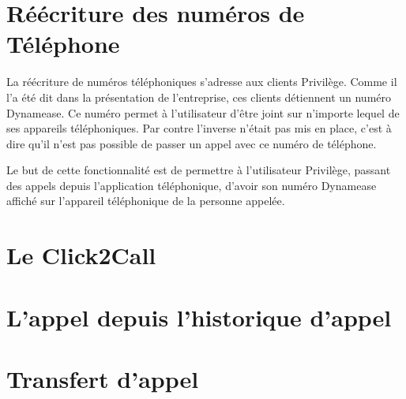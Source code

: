 \section{Réécriture des numéros de Téléphone}

La réécriture de numéros téléphoniques s'adresse aux clients Privilège. Comme il l'a été dit dans la présentation de l'entreprise, ces clients détiennent un numéro Dynamease. Ce numéro permet à l'utilisateur d'être joint sur n'importe lequel de ses appareils téléphoniques. Par contre l'inverse n'était pas mis en place, c'est à dire qu'il n'est pas possible de passer un appel avec ce numéro de téléphone.

Le but de cette fonctionnalité est de permettre à l'utilisateur Privilège, passant des appels depuis l'application téléphonique, d'avoir son numéro Dynamease affiché sur l'appareil téléphonique de la personne appelée.

\section{Le Click2Call}

\section{L'appel depuis l'historique d'appel}

\section{Transfert d'appel}